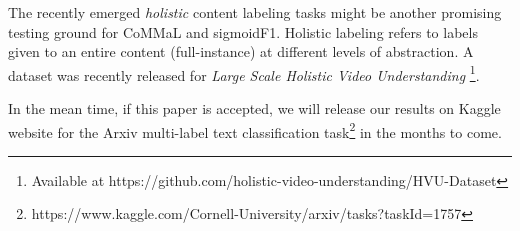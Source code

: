 The recently emerged \textit{holistic} content labeling tasks might be another promising testing ground for CoMMaL and sigmoidF1. Holistic labeling refers to labels given to an entire content (full-instance) at different levels of abstraction. A dataset was recently released for \emph{Large Scale Holistic Video Understanding} \cite{holisticVideoData}\footnote{Available at https://github.com/holistic-video-understanding/HVU-Dataset}.

\vspace{\baselineskip}

In the mean time, if this paper is accepted, we will release our results on Kaggle website for the Arxiv multi-label text classification task\footnote{https://www.kaggle.com/Cornell-University/arxiv/tasks?taskId=1757} in the months to come.





